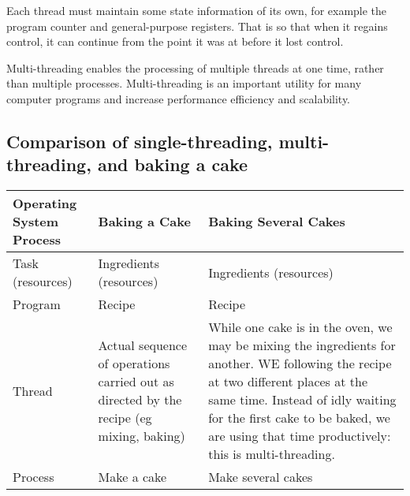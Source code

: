 Each thread must maintain some state information of its own, for example the program counter and general-purpose registers. That is so that when it regains control, it can continue from the point it was at before it lost control. 

Multi-threading enables the processing of multiple threads at one time, rather than multiple processes. Multi-threading is an important utility for many computer programs and increase performance efficiency and scalability.

\subsection{Comparison of single-threading, multi-threading, and baking a cake}

\begin{table}[H]
    \centering
    \begin{tabular}{p{} p{} p{}}
        \textbf{Operating System Process} & \textbf{Baking a Cake} & \textbf{Baking Several Cakes}\\
        \hline
        \hline
        Task (resources) & Ingredients (resources) & Ingredients (resources)\\
        \hline
        Program & Recipe & Recipe \\
        \hline
        Thread & Actual sequence of operations carried out as directed by the recipe (eg mixing, baking) & While one cake is in the oven, we may be mixing the ingredients for another. WE following the recipe at two different places at the same time. Instead of idly waiting for the first cake to be baked, we are using that time productively: this is multi-threading.\\
        \hline
        Process & Make a cake & Make several cakes\\
        \hline
    \end{tabular}
\end{table}